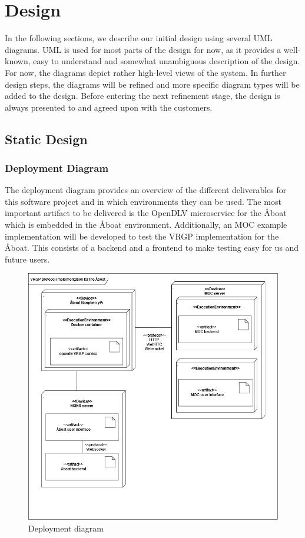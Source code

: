 \section{Design}\label{sec:design}

In the following sections, we describe our initial design using several UML diagrams. UML is used for most parts of the design for now, as it provides a well-known, easy to understand and somewhat unambiguous description of the design. For now, the diagrams depict rather high-level views of the system. In further design steps, the diagrams will be refined and more specific diagram types will be added to the design. Before entering the next refinement stage, the design is always presented to and agreed upon with the customers.

\subsection{Static Design}

\subsubsection{Deployment Diagram}

The deployment diagram provides an overview of the different deliverables for this software project and in which environments they can be used. The most important artifact to be delivered is the OpenDLV microservice for the Åboat which is embedded in the Åboat environment. Additionally, an MOC example implementation will be developed to test the VRGP implementation for the Åboat. This consists of a backend and a frontend to make testing easy for us and future users.

\begin{figure}[ht]
	\centering
	\includegraphics[width=\linewidth]{uml/deployment-diagram}
	\caption{Deployment diagram}
	\label{fig:deployment-diagram}
\end{figure}

